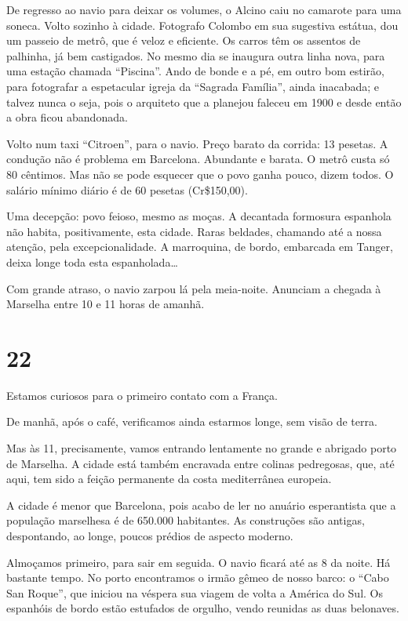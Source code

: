 De regresso ao navio para deixar os volumes, o Alcino caiu no camarote para uma soneca. Volto sozinho à cidade. Fotografo Colombo em sua sugestiva estátua, dou um passeio de metrô, que é veloz e eficiente. Os carros têm os assentos de palhinha, já bem castigados. No mesmo dia se inaugura outra linha nova, para uma estação chamada ``Piscina''. Ando de bonde e a pé, em outro bom estirão, para fotografar a espetacular igreja da ``Sagrada Família'', ainda inacabada; e talvez nunca o seja, pois o arquiteto que a planejou faleceu em 1900 e desde então a obra ficou abandonada.

Volto num taxi ``Citroen'', para o navio. Preço barato da corrida: 13 pesetas. A condução não é problema em Barcelona. Abundante e barata. O metrô custa só 80 cêntimos. Mas não se pode esquecer que o povo ganha pouco, dizem todos. O salário mínimo diário é de 60 pesetas (Cr\$150,00).

Uma decepção: povo feioso, mesmo as moças. A decantada formosura espanhola não habita, positivamente, esta cidade. Raras beldades, chamando até a nossa atenção, pela excepcionalidade. A marroquina, de bordo, embarcada em Tanger, deixa longe toda esta espanholada\ldots

Com grande atraso, o navio zarpou lá pela meia-noite. Anunciam a chegada à Marselha entre 10 e 11 horas de amanhã.

\section*{22 \adfflatleafright {}}

Estamos curiosos para o primeiro contato com a França.

De manhã, após o café, verificamos ainda estarmos longe, sem visão de terra.

Mas às 11, precisamente, vamos entrando lentamente no grande e abrigado porto de Marselha. A cidade está também encravada entre colinas pedregosas, que, até aqui, tem sido a feição permanente da costa mediterrânea europeia.

A cidade é menor que Barcelona, pois acabo de ler no anuário esperantista que a população marselhesa é de 650.000 habitantes. As construções são antigas, despontando, ao longe, poucos prédios de aspecto moderno.

Almoçamos primeiro, para sair em seguida. O navio ficará até as 8 da noite. Há bastante tempo. No porto encontramos o irmão gêmeo de nosso barco: o ``Cabo San Roque'', que iniciou na véspera sua viagem de volta a América do Sul. Os espanhóis de bordo estão estufados de orgulho, vendo reunidas as duas belonaves.

